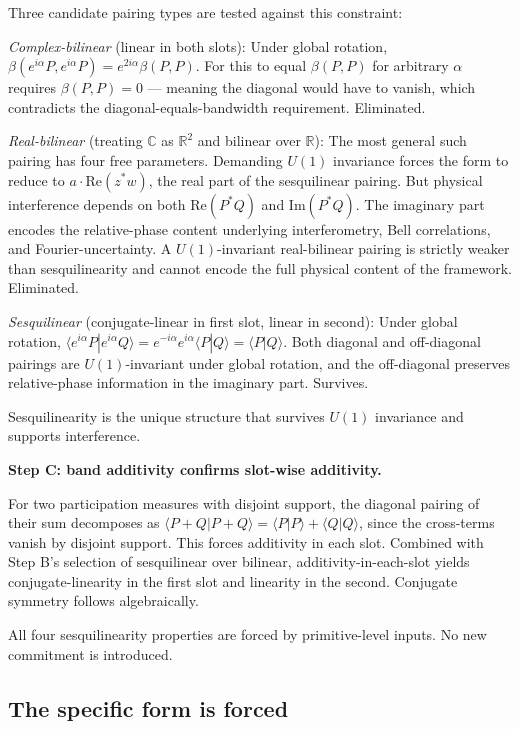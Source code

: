\documentclass[11pt,a4paper]{article}
\begin{document}
Three candidate pairing types are tested against this constraint:

\emph{Complex-bilinear} (linear in both slots): Under global rotation, $\beta(e^{i\alpha}P, e^{i\alpha}P) = e^{2i\alpha}\beta(P, P)$. For this to equal $\beta(P, P)$ for arbitrary $\alpha$ requires $\beta(P, P) = 0$ --- meaning the diagonal would have to vanish, which contradicts the diagonal-equals-bandwidth requirement. Eliminated.

\emph{Real-bilinear} (treating $\mathbb{C}$ as $\mathbb{R}^2$ and bilinear over $\mathbb{R}$): The most general such pairing has four free parameters. Demanding $U(1)$ invariance forces the form to reduce to $a\cdot\mathrm{Re}(z^*w)$, the real part of the sesquilinear pairing. But physical interference depends on both $\mathrm{Re}(P^*Q)$ and $\mathrm{Im}(P^*Q)$. The imaginary part encodes the relative-phase content underlying interferometry, Bell correlations, and Fourier-uncertainty. A $U(1)$-invariant real-bilinear pairing is strictly weaker than sesquilinearity and cannot encode the full physical content of the framework. Eliminated.

\emph{Sesquilinear} (conjugate-linear in first slot, linear in second): Under global rotation, $\langle e^{i\alpha}P | e^{i\alpha}Q\rangle = e^{-i\alpha} e^{i\alpha}\langle P|Q\rangle = \langle P|Q\rangle$. Both diagonal and off-diagonal pairings are $U(1)$-invariant under global rotation, and the off-diagonal preserves relative-phase information in the imaginary part. Survives.

Sesquilinearity is the unique structure that survives $U(1)$ invariance and supports interference.

\textbf{Step C: band additivity confirms slot-wise additivity.}

For two participation measures with disjoint support, the diagonal pairing of their sum decomposes as $\langle P+Q|P+Q\rangle = \langle P|P\rangle + \langle Q|Q\rangle$, since the cross-terms vanish by disjoint support. This forces additivity in each slot. Combined with Step B's selection of sesquilinear over bilinear, additivity-in-each-slot yields conjugate-linearity in the first slot and linearity in the second. Conjugate symmetry follows algebraically.

All four sesquilinearity properties are forced by primitive-level inputs. No new commitment is introduced.

\subsection{The specific form is forced}
\end{document}
